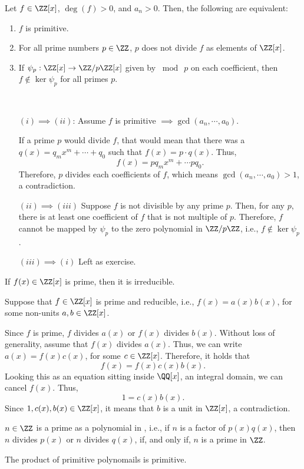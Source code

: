 \begin{lem}
	Let $f \in \ZZ[x]$,  $\deg(f) > 0$, and  $a_n > 0$. Then, the following are equivalent:
	 \begin{enumerate}
		\item $f$ is primitive.
		\item For all prime numbers $p \in \ZZ$, $p$ does not divide $f$ as elements of $\ZZ[x]$. 
		\item If $\psi_p : \ZZ[x] \to \ZZ/p\ZZ[x]$ given by $\bmod{\ p}$ on each coefficient, then $f \not\in \ker\psi_p$ for all primes $p$.
	\end{enumerate}
\end{lem}

\begin{dem}~
	\begin{itemize}
		\item[$(i) \implies (ii)$:] Assume $f$ is primitive $\implies \gcd(a_n, \cdots, a_0)$.
			
			If a prime $p$ would divide $f$, that would mean that there was a $q(x) = q_mx^m + \cdots + q_0$ such that $f(x) = p \cdot q(x)$. Thus, \[f(x) = pq_mx^m + \cdots pq_0.\]
			Therefore, $p$ divides each coefficients of $f$, which means $\gcd(a_n, \cdots, a_0) > 1$, a contradiction.

		\item[$(ii) \implies (iii)$] Suppose $f$ is not divisible by any prime $p$. Then, for any $p$, there is at least one coefficient of $f$ that is not multiple of $p$. Therefore, $f$ cannot be mapped by $\psi_p$ to the zero polynomial in $\ZZ/p\ZZ$, i.e.,  $f \not\in \ker\psi_p$.

		\item[$(iii) \implies (i)$] Left as exercise.
	\end{itemize}
\end{dem}

\begin{prop}
	If $f(x) \in \ZZ[x]$ is prime, then it is irreducible.
\end{prop}
\begin{dem}
	Suppose that $f \in \ZZ[x]$ is prime and reducible, i.e., $f(x) = a(x)b(x)$, for some non-units $a, b \in \ZZ[x]$. 

	Since $f$ is prime, $f$ divides $a(x)$ or $f(x)$ divides $b(x)$. Without loss of generality, assume that $f(x)$ divides $a(x)$. Thus, we can write $a(x) = f(x) c(x)$, for some $c\in \ZZ[x]$. Therefore, it holds that \[f(x) = f(x) c(x) b(x).\] Looking this as an equation sitting inside $\QQ[x]$, an integral domain, we can cancel $f(x)$. Thus, \[1 = c(x) b(x).\]
	Since $1, c(x), b(x) \in \ZZ[x]$, it means that $b$ is a unit in $\ZZ[x]$, a contradiction.
\end{dem}

\begin{prop}
	$n \in \ZZ$ is a prime as a polynomial in \ZZ[x], i.e., if $n$ is a factor of $p(x)q(x)$, then $n$ divides $p(x)$ or $n$ divides $q(x)$, if, and only if, $n$ is a prime in $\ZZ$. 
\end{prop}

\begin{prop}
	The product of primitive polynomails is primitive.
\end{prop}

